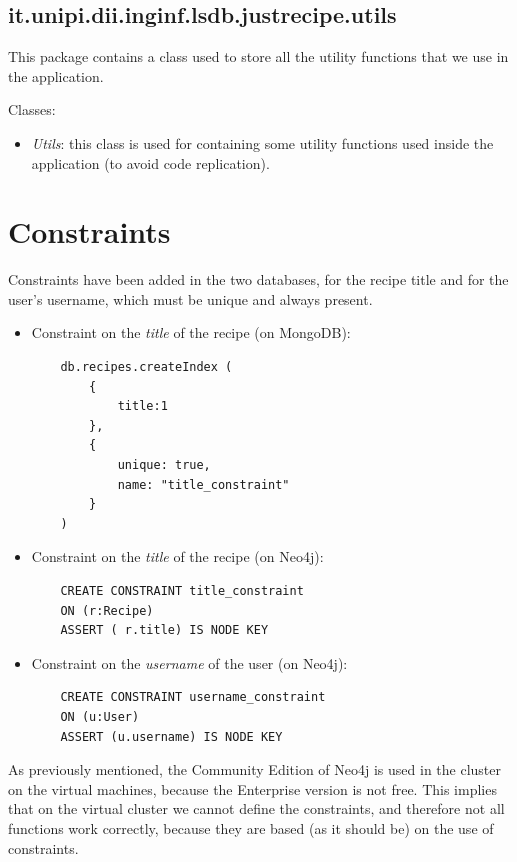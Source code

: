 \documentclass[a4paper]{report}
\begin{document}
\subsection {it.unipi.dii.inginf.lsdb.justrecipe.utils}
This package contains a class used to store all the utility functions that we use in the application.

\noindent Classes:
 \begin{itemize}
	\item \emph{Utils}: this class is used for containing some utility functions used inside the application (to avoid code replication).
\end{itemize}

\section{Constraints}
Constraints have been added in the two databases, for the recipe title and for the user's username, which must be unique and always present.
\begin{itemize}
	\item Constraint on the \emph{title} of the recipe (on MongoDB): 
	\lstset{ language=java}
	\begin{lstlisting}
	db.recipes.createIndex (
		{
			title:1
		},
		{
			unique: true,
			name: "title_constraint"
		}
	)	
	\end{lstlisting} 
	\item Constraint on the \emph{title} of the recipe (on Neo4j): 
	\begin{lstlisting}
	CREATE CONSTRAINT title_constraint 
	ON (r:Recipe) 
	ASSERT ( r.title) IS NODE KEY	
	\end{lstlisting} 
	\item Constraint on the \emph{username} of the user (on Neo4j): 
	\lstset{ language=java}
	\begin{lstlisting}
	CREATE CONSTRAINT username_constraint 
	ON (u:User) 
	ASSERT (u.username) IS NODE KEY	
	\end{lstlisting} 
\end{itemize}
\noindent As previously mentioned, the Community Edition of Neo4j is used in the cluster on the virtual machines, because the Enterprise version is not free. This implies that on the virtual cluster we cannot define the constraints, and therefore not all functions work correctly, because they are based (as it should be) on the use of constraints.
\end{document}
